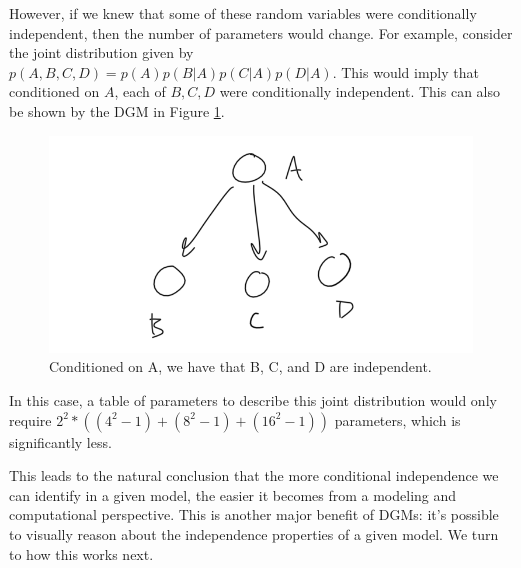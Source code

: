 However, if we knew that some of these random variables were conditionally independent, then the number of parameters would change. For example, consider the joint distribution given by $p(A, B, C, D) = p(A)p(B|A)p(C|A)p(D|A)$. This would imply that conditioned on $A$, each of $B, C, D$ were conditionally independent. This can also be shown by the DGM in Figure \ref{fig:complexity-dgm}.
\begin{figure}
	\centering
	\includegraphics[width=0.5\paperwidth]{../GraphicalModels/fig/complexity-dgm.png}
    \caption{Conditioned on A, we have that B, C, and D are independent.}
	\label{fig:complexity-dgm}
\end{figure}

In this case, a table of parameters to describe this joint distribution would only require $2^2 * ((4^2 - 1) + (8^2 - 1) + (16^2 - 1))$ parameters, which is significantly less.

This leads to the natural conclusion that the more conditional independence we can identify in a given model, the easier it becomes from a modeling and computational perspective. This is another major benefit of DGMs: it's possible to visually reason about the independence properties of a given model. We turn to how this works next.

